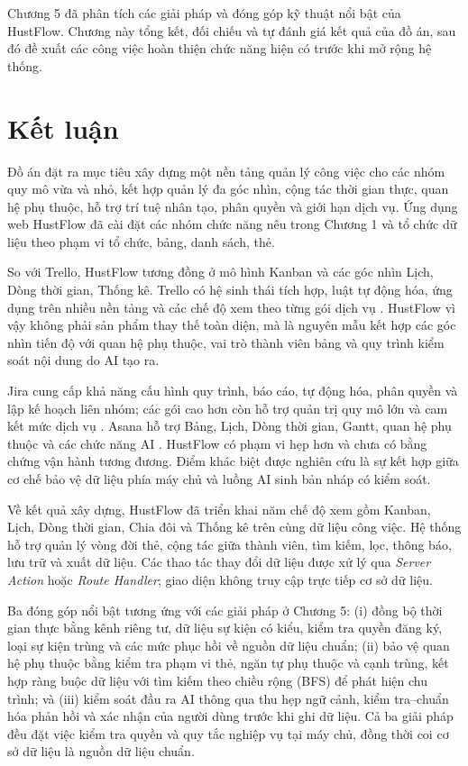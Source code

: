 \documentclass[../DoAn.tex]{subfiles}
\begin{document}
Chương 5 đã phân tích các giải pháp và đóng góp kỹ thuật nổi bật của HustFlow. Chương này tổng kết, đối chiếu và tự đánh giá kết quả của đồ án, sau đó đề xuất các công việc hoàn thiện chức năng hiện có trước khi mở rộng hệ thống.

\section{Kết luận}
\label{section:6.1}

Đồ án đặt ra mục tiêu xây dựng một nền tảng quản lý công việc cho các nhóm quy mô vừa và nhỏ, kết hợp quản lý đa góc nhìn, cộng tác thời gian thực, quan hệ phụ thuộc, hỗ trợ trí tuệ nhân tạo, phân quyền và giới hạn dịch vụ. Ứng dụng web HustFlow đã cài đặt các nhóm chức năng nêu trong Chương 1 và tổ chức dữ liệu theo phạm vi tổ chức, bảng, danh sách, thẻ. 

So với Trello, HustFlow tương đồng ở mô hình Kanban và các góc nhìn Lịch, Dòng thời gian, Thống kê. Trello có hệ sinh thái tích hợp, luật tự động hóa, ứng dụng trên nhiều nền tảng và các chế độ xem theo từng gói dịch vụ \cite{trelloofficial}. HustFlow vì vậy không phải sản phẩm thay thế toàn diện, mà là nguyên mẫu kết hợp các góc nhìn tiến độ với quan hệ phụ thuộc, vai trò thành viên bảng và quy trình kiểm soát nội dung do AI tạo ra.

Jira cung cấp khả năng cấu hình quy trình, báo cáo, tự động hóa, phân quyền và lập kế hoạch liên nhóm; các gói cao hơn còn hỗ trợ quản trị quy mô lớn và cam kết mức dịch vụ \cite{jiraofficial}. Asana hỗ trợ Bảng, Lịch, Dòng thời gian, Gantt, quan hệ phụ thuộc và các chức năng AI \cite{asanaofficial}. HustFlow có phạm vi hẹp hơn và chưa có bằng chứng vận hành tương đương. Điểm khác biệt được nghiên cứu là sự kết hợp giữa cơ chế bảo vệ dữ liệu phía máy chủ và luồng AI sinh bản nháp có kiểm soát.

Về kết quả xây dựng, HustFlow đã triển khai năm chế độ xem gồm Kanban, Lịch, Dòng thời gian, Chia đôi và Thống kê trên cùng dữ liệu công việc. Hệ thống hỗ trợ quản lý vòng đời thẻ, cộng tác giữa thành viên, tìm kiếm, lọc, thông báo, lưu trữ và xuất dữ liệu. Các thao tác thay đổi dữ liệu được xử lý qua \textit{Server Action} hoặc \textit{Route Handler}; giao diện không truy cập trực tiếp cơ sở dữ liệu.

Ba đóng góp nổi bật tương ứng với các giải pháp ở Chương 5: (i) đồng bộ thời gian thực bằng kênh riêng tư, dữ liệu sự kiện có kiểu, kiểm tra quyền đăng ký, loại sự kiện trùng và các mức phục hồi về nguồn dữ liệu chuẩn; (ii) bảo vệ quan hệ phụ thuộc bằng kiểm tra phạm vi thẻ, ngăn tự phụ thuộc và cạnh trùng, kết hợp ràng buộc dữ liệu với tìm kiếm theo chiều rộng (BFS) để phát hiện chu trình; và (iii) kiểm soát đầu ra AI thông qua thu hẹp ngữ cảnh, kiểm tra--chuẩn hóa phản hồi và xác nhận của người dùng trước khi ghi dữ liệu. Cả ba giải pháp đều đặt việc kiểm tra quyền và quy tắc nghiệp vụ tại máy chủ, đồng thời coi cơ sở dữ liệu là nguồn dữ liệu chuẩn.
\end{document}
